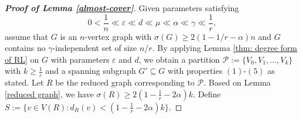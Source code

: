 \documentclass[11pt, a4paper]{article}
\theoremstyle{definition}
\newcommand{\eps}{\varepsilon}
\newcommand{\<}{\subseteq}
\begin{document}
\begin{proof}[\bf Proof of Lemma \ref{almost-cover}]
   Given parameters satisfying 
   $$0<\frac{1}{n}\ll \eps\ll d\ll\mu\ll \alpha\ll \gamma\ll \frac{1}{r},
   $$
   assume that $G$ is an $n$-vertex graph with $\sigma(G)\geq 2(1-{1}/{r}-\alpha)n$ and $G$ contains no  $\gamma$-independent set of size $n/r$. By applying Lemma \ref{thm: degree form of RL} on $G$ with parameters $\eps$ and $d$, we obtain  a partition $\mathcal{P}:=\{V_0,V_1,\ldots,V_k\}$ with $k \geq \frac{1}{\eps}$ and a spanning subgraph $G'\subseteq G$ with properties $(1)$-$(5)$ as stated. Let $R$ be the reduced graph corresponding to $\mathcal{P}$. Based on Lemma \ref{reduced graph}, we have $\sigma(R)\geq 2(1-\frac{1}{r}-2\alpha)k$. Define $S:=\{v\in V(R):d_R(v)<(1-\frac{1}{r}-2\alpha)k\}$.

   
   

\end{proof}
\end{document}
